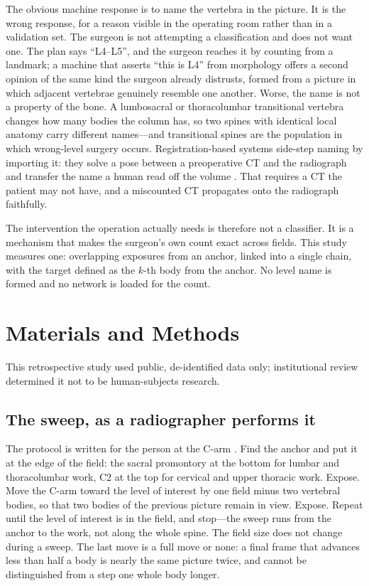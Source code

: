 \documentclass[11pt,letterpaper]{article}
\begin{document}
The obvious machine response is to name the vertebra in the picture. It is the wrong response, for a reason
visible in the operating room rather than in a validation set. The surgeon is not attempting a
classification and does not want one. The plan says ``L4--L5'', and the surgeon reaches it by counting from
a landmark; a machine that asserts ``this is L4'' from morphology offers a second opinion of the same kind
the surgeon already distrusts, formed from a picture in which adjacent vertebrae genuinely resemble one
another. Worse, the name is not a property of the bone. A lumbosacral or thoracolumbar transitional
vertebra changes how many bodies the column has, so two spines with identical local anatomy carry different
names---and transitional spines are the population in which wrong-level surgery occurs. Registration-based
systems side-step naming by importing it: they solve a pose between a preoperative CT and the radiograph
and transfer the name a human read off the volume \citep{levelcheck2012,otake2015}. That requires a CT the
patient may not have, and a miscounted CT propagates onto the radiograph faithfully.

The intervention the operation actually needs is therefore not a classifier. It is a mechanism that makes
the surgeon's own count exact across fields. This study measures one: overlapping exposures from an anchor,
linked into a single chain, with the target defined as the $k$-th body from the anchor. No level name is
formed and no network is loaded for the count.

\section*{Materials and Methods}

This retrospective study used public, de-identified data only; institutional review determined it not to be
human-subjects research.

\subsection*{The sweep, as a radiographer performs it}
The protocol is written for the person at the C-arm \citep{strong2021}. Find the anchor and put it at the
edge of the field: the sacral promontory at the bottom for lumbar and thoracolumbar work, C2 at the top for
cervical and upper thoracic work. Expose. Move the C-arm toward the level of interest by one field minus
two vertebral bodies, so that two bodies of the previous picture remain in view. Expose. Repeat until the
level of interest is in the field, and stop---the sweep runs from the anchor to the work, not along the
whole spine. The field size does not change during a sweep. The last move is a full move or none: a final
frame that advances less than half a body is nearly the same picture twice, and cannot be distinguished
from a step one whole body longer.
\end{document}
